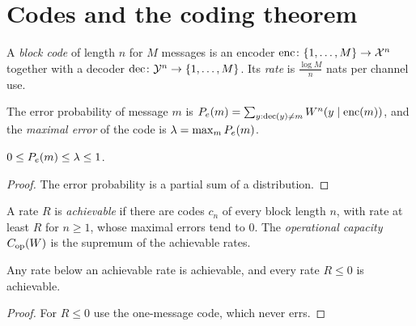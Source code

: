 \chapter{Codes and the coding theorem}
\label{chap:codes}

\begin{definition}
  \label{def:code}
  \leanok
  A \emph{block code} of length $n$ for $M$ messages is an encoder $\mathrm{enc} \colon \{1, \dots, M\} \to \mathcal X^n$
  together with a decoder $\mathrm{dec} \colon \mathcal Y^n \to \{1, \dots, M\}$.  Its \emph{rate} is
  $\frac{\log M}{n}$ nats per channel use.
\end{definition}

\begin{definition}
  \label{def:errorProb}
  \leanok
  The error probability of message $m$ is $P_e(m) = \sum_{y : \mathrm{dec}(y) \ne m} W^n(y \mid \mathrm{enc}(m))$,
  and the \emph{maximal error} of the code is $\lambda = \max_m P_e(m)$.
\end{definition}

\begin{lemma}
  \label{lem:errorProb_bounds}
  \leanok
  $0 \le P_e(m) \le \lambda \le 1$.
\end{lemma}
\begin{proof}
  \leanok
  The error probability is a partial sum of a distribution.
\end{proof}

\begin{definition}
  \label{def:achievable}
  \leanok
  A rate $R$ is \emph{achievable} if there are codes $c_n$ of every block length $n$, with rate at
  least $R$ for $n \ge 1$, whose maximal errors tend to $0$.  The \emph{operational capacity}
  $C_{\mathrm{op}}(W)$ is the supremum of the achievable rates.
\end{definition}

\begin{lemma}
  \label{lem:achievable_basic}
  \leanok
  Any rate below an achievable rate is achievable, and every rate $R \le 0$ is achievable.
\end{lemma}
\begin{proof}
  \leanok
  For $R \le 0$ use the one-message code, which never errs.
\end{proof}

